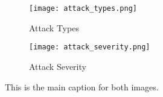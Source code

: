 \begin{figure}[H]
	\centering
	\begin{subfigure}[b]{0.4\textwidth}
		\centering
		\texttt{[image: attack\_types.png]}
		\caption{Attack Types}
		\label{figure:attack-types}
	\end{subfigure}
	\hspace{0.25cm} 
	\begin{subfigure}[b]{0.4\textwidth}
		\centering
		\texttt{[image: attack\_severity.png]}
		\caption{Attack Severity}
		\label{figure:attack-severity}
	\end{subfigure}
	
	\caption{This is the main caption for both images.}
	\label{figure:attacks}
\end{figure}





